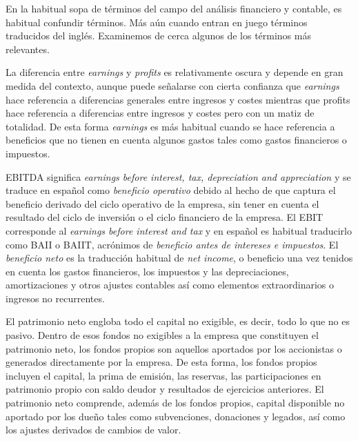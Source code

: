 \documentclass{nuevotema}
\begin{document}
\conceptos


En la habitual sopa de términos del campo del análisis financiero y contable, es habitual confundir términos. Más aún cuando entran en juego términos traducidos del inglés. Examinemos de cerca algunos de los términos más relevantes.

La diferencia entre \textit{earnings} y \textit{profits} es relativamente oscura y depende en gran medida del contexto, aunque puede señalarse con cierta confianza que \textit{earnings} hace referencia a diferencias generales entre ingresos y costes mientras que profits hace referencia a diferencias entre ingresos y costes pero con un matiz de totalidad. De esta forma \textit{earnings} es más habitual cuando se hace referencia a beneficios que no tienen en cuenta algunos gastos tales como gastos financieros o impuestos. 

EBITDA significa \textit{earnings before interest, tax, depreciation and appreciation} y se traduce en español como \textit{beneficio operativo} debido al hecho de que captura el beneficio derivado del ciclo operativo de la empresa, sin tener en cuenta el resultado del ciclo de inversión o el ciclo financiero de la empresa. El EBIT corresponde al \textit{earnings before interest and tax} y en español es habitual traducirlo como BAII o BAIIT, acrónimos de \textit{beneficio antes de intereses e impuestos}. El \textit{beneficio neto} es la traducción habitual de \textit{net income}, o beneficio una vez tenidos en cuenta los gastos financieros, los impuestos y las depreciaciones, amortizaciones y otros ajustes contables así como elementos extraordinarios o ingresos no recurrentes.


El patrimonio neto engloba todo el capital no exigible, es decir, todo lo que no es pasivo. Dentro de esos fondos no exigibles a la empresa que constituyen el patrimonio neto, los fondos propios son aquellos aportados por los accionistas o generados directamente por la empresa. De esta forma, los fondos propios incluyen el capital, la prima de emisión, las reservas, las participaciones en patrimonio propio con saldo deudor y resultados de ejercicios anteriores. El patrimonio neto comprende, además de los fondos propios, capital disponible no aportado por los dueño tales como subvenciones, donaciones y legados, así como los ajustes derivados de cambios de valor.
\end{document}
